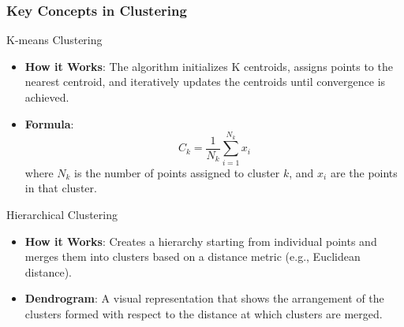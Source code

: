 \documentclass[aspectratio=169]{beamer}
\begin{document}
\begin{frame}[fragile]
    \frametitle{Key Concepts in Clustering}

    \begin{block}{K-means Clustering}
        \begin{itemize}
            \item \textbf{How it Works}: The algorithm initializes K centroids, assigns points to the nearest centroid, and iteratively updates the centroids until convergence is achieved.
            \item \textbf{Formula}:
            \begin{equation}
                C_k = \frac{1}{N_k} \sum_{i=1}^{N_k} x_i
            \end{equation}
            where \( N_k \) is the number of points assigned to cluster \( k \), and \( x_i \) are the points in that cluster.
        \end{itemize}
    \end{block}
    
    \begin{block}{Hierarchical Clustering}
        \begin{itemize}
            \item \textbf{How it Works}: Creates a hierarchy starting from individual points and merges them into clusters based on a distance metric (e.g., Euclidean distance).
            \item \textbf{Dendrogram}: A visual representation that shows the arrangement of the clusters formed with respect to the distance at which clusters are merged.
        \end{itemize}
    \end{block}
\end{frame}
\end{document}
